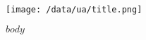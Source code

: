 \documentclass{book}
\begin{document}
  \pagestyle{plain}
  \justifying

  \thispagestyle{empty}

  \vspace*{\fill}
    \begin{center}
      \texttt{[image: /data/ua/title.png]}
    \end{center}
  \vspace*{\fill}

  \setcounter{page}{0}


  $body$
\end{document}
